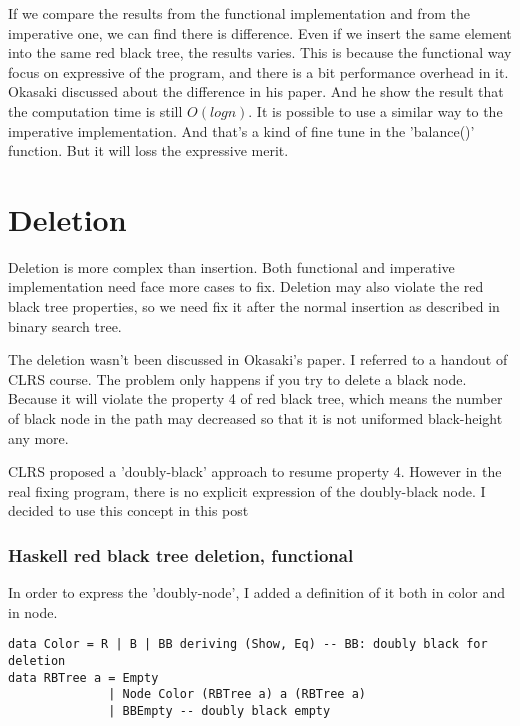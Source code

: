 \documentclass{article}
\begin{document}
If we compare the results from the functional implementation and from the imperative one, we can 
find there is difference. Even if we insert the same element into the same red black tree, the
results varies. This is because the functional way focus on expressive of the program, and there 
is a bit performance overhead in it. Okasaki discussed about the difference in his paper\cite{okasaki}.
And he show the result that the computation time is still $O(log n)$. It is possible to use a 
similar way to the imperative implementation. And that's a kind of fine tune in the 'balance()'
function. But it will loss the expressive merit.


\section{Deletion}

Deletion is more complex than insertion. Both functional and imperative implementation 
need face more cases to fix. Deletion may also violate the red black tree properties,
so we need fix it after the normal insertion as described in binary search tree\cite{bst-lxy}.

The deletion wasn't been discussed in Okasaki's paper\cite{okasaki}. I referred to a
handout of CLRS course\cite{lyn}. The problem only happens if you try to delete a black node.
Because it will violate the property 4 of red black tree, which means the number of black
node in the path may decreased so that it is not uniformed black-height any more.

CLRS proposed a 'doubly-black' approach to resume property 4. However in the real fixing
program, there is no explicit expression of the doubly-black node. I decided to use
this concept in this post

\subsubsection*{Haskell red black tree deletion, functional}

In order to express the 'doubly-node', I added a definition of it both in color and in node.

\lstset{language=Haskell}
\begin{lstlisting}
data Color = R | B | BB deriving (Show, Eq) -- BB: doubly black for deletion
data RBTree a = Empty
              | Node Color (RBTree a) a (RBTree a)
              | BBEmpty -- doubly black empty
\end{lstlisting}
\end{document}
